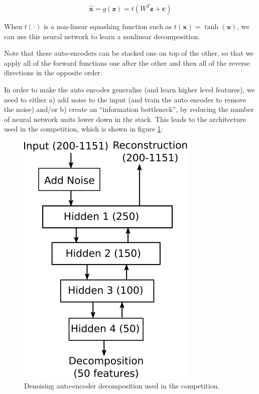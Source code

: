 \documentclass{article}
\begin{document}
\begin{equation}
\label{eqn:autoencoder-decode}
\hat{\mathbf{x}} = g(\mathbf{z}) = t(W^T\mathbf{z} + \mathbf{c})
\end{equation}

When $t(\cdot)$ is a non-linear squashing function such as $t(\mathbf{x}) = \tanh(\mathbf{x})$, we can use this neural network to learn a nonlinear decomposition.

Note that these auto-encoders can be stacked one on top of the other, so that we apply all of the forward functions one after the other and then all of the reverse directions in the opposite order.

In order to make the auto encoder generalise (and learn higher level features), we need to either a) add noise to the input (and train the auto encoder to remove the noise) and/or b) create an ``information bottleneck'', by reducing the number of neural network units lower down in the stack.  This leads to the architecture used in the competition, which is shown in figure \ref{fig:autoencoder-decomposition}:

\begin{figure}[ht]
\vskip 0.2in
\begin{center}
\centerline{\includegraphics{auto-encoder}}
\caption{Denoising auto-encoder decomposition used in the competition.}
\label{fig:autoencoder-decomposition}
\end{center}
\vskip -0.2in
\end{figure} 
\end{document}
